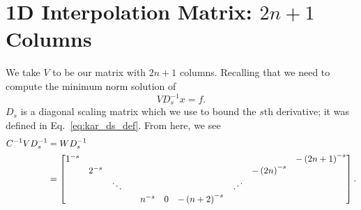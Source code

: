 \section{1D \CV{} Interpolation Matrix: $2n+1$ Columns}
\label{sec:CV_1D_2n}

We take $V$ to be our \CV{} matrix with $2n+1$ columns.
Recalling that we need to compute the minimum norm solution of
%
\begin{equation}
    VD_{s}^{-1}x = f.
\end{equation}
%
$D_{s}$ is a diagonal scaling matrix which we use
to bound the $s$th derivative; it was defined in
Eq.~\eqref{eq:kar_ds_def}.
From here, we see
%
\begin{align}
    C^{-1}VD_{s}^{-1} &= WD_{s}^{-1} \nonumber\\
        &= \begin{bmatrix}
            1^{-s} & & & & & & & & & -\left( 2n+1 \right)^{-s} \\
            & 2^{-s} & & & & & & & -\left( 2n \right)^{-s} & \\
            & & \ddots & & & & & \iddots & & \\
            & & & & n^{-s} & 0 & -\left( n+2 \right)^{-s} & & & \\
        \end{bmatrix}.
\end{align}

